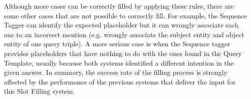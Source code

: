 Although more cases can be correctly filled by applying these rules, there are some other 
cases that are not possible to correctly fill. For example, the Sequence Tagger can identify 
the expected placeholder but it can wrongly associate each one to an incorrect mention (e.g. 
wrongly associate the subject entity and object entity of one query triple). A more serious 
case is when the Sequence tagger provides placeholders that have nothing to do with the ones 
found in the Query Template, usually because both systems identified a different intention in 
the given answer. In summary, the success rate of the filling process is strongly affected by 
the performance of the previous systems that deliver the input for this Slot Filling system.
